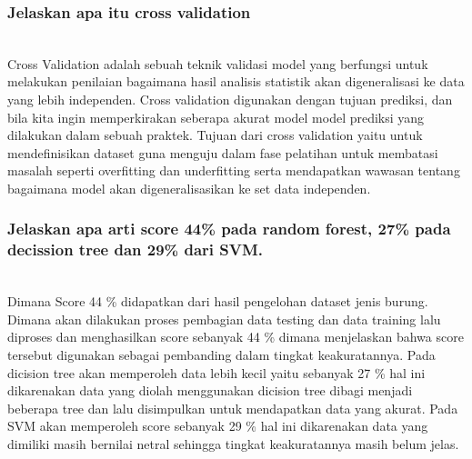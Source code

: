 \subsubsection{ Jelaskan apa itu cross validation}
\hfill\\
Cross Validation adalah sebuah teknik validasi model yang berfungsi untuk melakukan penilaian bagaimana hasil analisis statistik akan digeneralisasi ke data yang lebih independen. Cross validation digunakan dengan tujuan prediksi, dan bila kita ingin memperkirakan seberapa akurat model model prediksi yang dilakukan dalam sebuah praktek. Tujuan dari cross validation yaitu untuk mendefinisikan dataset guna menguju dalam fase pelatihan untuk membatasi masalah seperti overfitting dan underfitting serta mendapatkan wawasan tentang bagaimana model akan digeneralisasikan ke set data independen.

\subsubsection{Jelaskan apa arti score 44\% pada random forest, 27\% pada decission tree dan 29\% dari SVM.}
\hfill\\
Dimana Score 44 \% didapatkan dari hasil pengelohan dataset jenis burung. Dimana akan dilakukan proses pembagian data testing dan data training lalu diproses dan menghasilkan score sebanyak 44 \% dimana menjelaskan bahwa score tersebut digunakan sebagai pembanding dalam tingkat keakuratannya. Pada dicision tree akan memperoleh data lebih kecil yaitu sebanyak 27 \% hal ini dikarenakan data yang diolah menggunakan dicision tree dibagi menjadi beberapa tree dan lalu disimpulkan untuk mendapatkan data yang akurat. Pada SVM akan memperoleh score sebanyak 29 \% hal ini dikarenakan data yang dimiliki masih bernilai netral sehingga tingkat keakuratannya masih belum jelas.

